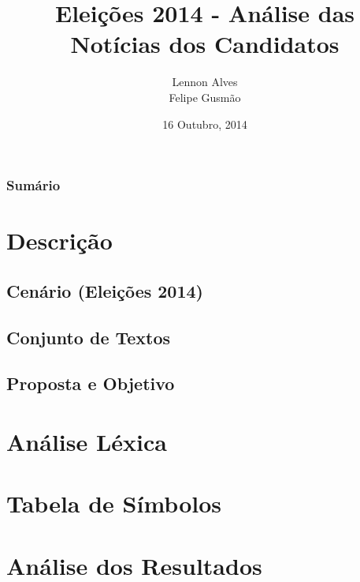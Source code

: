 %

\usepackage[utf8]{inputenc}


\title[Atividade Extra 02]{Eleições 2014 - Análise das Notícias dos Candidatos}

\author{Lennon Alves \\ Felipe Gusmão}
\date{16 Outubro, 2014}



\begin{frame}
\titlepage
\end{frame}



\begin{frame}
\frametitle{Sumário}
\tableofcontents

\section{Descrição}
\subsection{Cenário (Eleições 2014)}
\subsection{Conjunto de Textos}
\subsection{Proposta e Objetivo}
\section{Análise Léxica}
\section{Tabela de Símbolos}
\section{Análise dos Resultados}

\end{frame}

